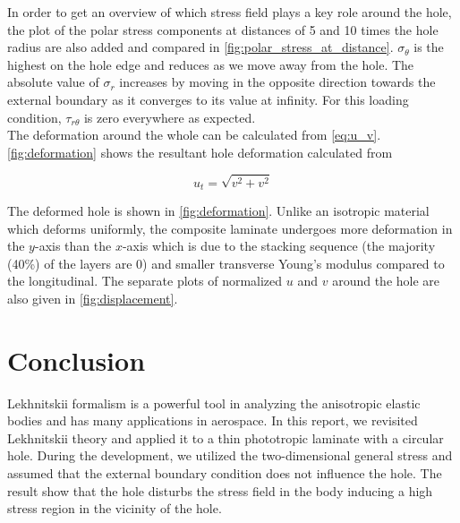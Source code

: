 \documentclass{article}
\begin{document}
In order to get an overview of which stress field plays a key role around the hole, the plot of the polar stress components at distances of 5 and 10 times the hole radius are also added and compared in \cref{fig:polar_stress_at_distance}. $\sigma_{\theta}$ is the highest on the hole edge and reduces as we move away from the hole. The absolute value of $\sigma_r$ increases by moving in the opposite direction towards the external boundary as it converges to its value at infinity. For this loading condition, $\tau_{r\theta}$ is zero everywhere as expected. \\

The deformation around the whole can be calculated from \cref{eq:u_v}. \cref{fig:deformation} shows the resultant hole deformation calculated from 

\begin{equation*}
    u_t = \sqrt{v^2 + v^2}
\end{equation*}



The deformed hole is shown in \cref{fig:deformation}. Unlike an isotropic material which deforms uniformly, the composite laminate undergoes more deformation in the $y$-axis than the $x$-axis which is due to the stacking sequence (the majority (40\%) of the layers are 0) and smaller transverse Young's modulus compared to the longitudinal. The separate plots of normalized $u$ and $v$ around the hole are also given in \cref{fig:displacement}.

\section{Conclusion}
Lekhnitskii formalism is a powerful tool in analyzing the anisotropic elastic bodies and has many applications in aerospace. In this report, we revisited Lekhnitskii theory and applied it to a thin phototropic laminate with a circular hole. During the development, we utilized the two-dimensional general stress and assumed that the external boundary condition does not influence the hole. The result show that the hole disturbs the stress field in the body inducing a high stress region in the vicinity of the hole.
\end{document}
